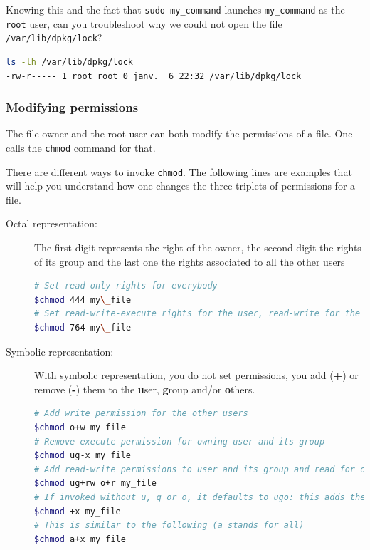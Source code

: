 \documentclass[12pt]{article}
\begin{document}
Knowing this and the fact that \texttt{sudo my\_command} launches \texttt{my\_command} as the \texttt{root} user, can you troubleshoot why we could not open the file \texttt{/var/lib/dpkg/lock}?

\begin{lstlisting}[language=bash]
ls -lh /var/lib/dpkg/lock
-rw-r----- 1 root root 0 janv.  6 22:32 /var/lib/dpkg/lock
\end{lstlisting}

\subsubsection{Modifying permissions}

The file owner and the root user can both modify the permissions of a file. One calls the \texttt{chmod} command for that.

There are different ways to invoke \texttt{chmod}. The following lines are examples that will help you understand how one changes the three triplets of permissions for a file.


\begin{description}
	\item[Octal representation:] The first digit represents the right of the owner, the second digit the rights of its group and the last one the rights associated to all the other users

\begin{lstlisting}[language=bash]
# Set read-only rights for everybody
$chmod 444 my\_file
# Set read-write-execute rights for the user, read-write for the users of its group and read-only for other users
$chmod 764 my\_file
\end{lstlisting}

	\item[Symbolic representation:] With symbolic representation, you do not set permissions, you add (\textbf{+}) or remove (\textbf{-}) them to the \textbf{u}ser, \textbf{g}roup and/or \textbf{o}thers.

\begin{lstlisting}[language=bash]
# Add write permission for the other users
$chmod o+w my_file
# Remove execute permission for owning user and its group
$chmod ug-x my_file
# Add read-write permissions to user and its group and read for others
$chmod ug+rw o+r my_file
# If invoked without u, g or o, it defaults to ugo: this adds the execute permission on the file for all users
$chmod +x my_file
# This is similar to the following (a stands for all)
$chmod a+x my_file
\end{lstlisting}
\end{description}
\end{document}
